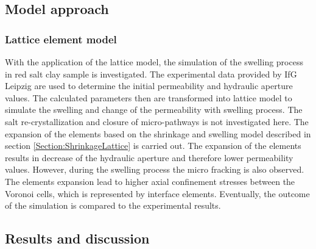 

\subsection{Model approach}
\subsubsection*{Lattice element model}

With the application of the lattice model, the simulation of the swelling process in red salt clay sample is investigated. The experimental data provided by IfG Leipzig are used to determine the initial permeability and hydraulic aperture values. The calculated parameters then are transformed into lattice model to simulate the swelling and change of the permeability with swelling process. The salt re-crystallization and closure of micro-pathways is not investigated here. The expansion of the elements based on the shrinkage and swelling model described in section \ref{Section:ShrinkageLattice} is carried out. The expansion of the elements results in decrease of the hydraulic aperture and therefore lower permeability values. However, during the swelling process the micro fracking is also observed. The elements expansion lead to higher axial confinement stresses between the Voronoi cells, which is represented by interface elements.  Eventually, the outcome of the simulation is compared to the experimental results. 


\subsection{Results and discussion}